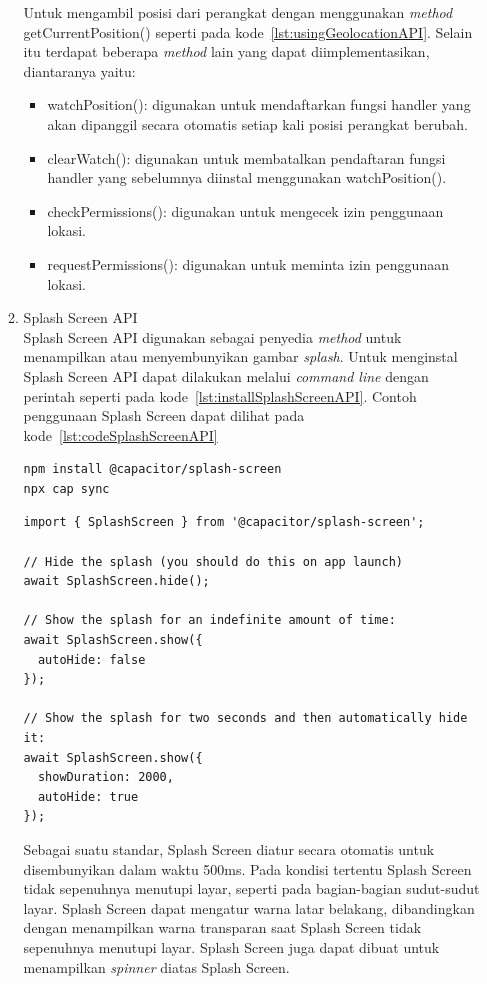 \begin{enumerate}
\begin{enumerate}
		Untuk mengambil posisi dari perangkat dengan menggunakan \textit{method} getCurrentPosition() seperti pada kode~\ref{lst:usingGeolocationAPI}. Selain itu terdapat beberapa \textit{method} lain yang dapat diimplementasikan, diantaranya yaitu:
		\newpage
			\begin{itemize}
				\item watchPosition(): digunakan untuk mendaftarkan fungsi handler yang akan dipanggil secara otomatis setiap kali posisi perangkat berubah.
				\item clearWatch(): digunakan untuk membatalkan pendaftaran fungsi handler yang sebelumnya diinstal menggunakan watchPosition().
				\item checkPermissions(): digunakan untuk mengecek izin penggunaan lokasi.
				\item requestPermissions(): digunakan untuk meminta izin penggunaan lokasi.
			\end{itemize}
			\item Splash Screen API	\\
			Splash Screen API digunakan sebagai penyedia \textit{method} untuk menampilkan atau menyembunyikan gambar \textit{splash}. Untuk menginstal Splash Screen API dapat dilakukan melalui \textit{command line} dengan perintah seperti pada kode~\ref{lst:installSplashScreenAPI}. Contoh penggunaan Splash Screen dapat dilihat pada kode~\ref{lst:codeSplashScreenAPI}
\begin{lstlisting}[label={lst:installSplashScreenAPI}, caption=Kode untuk Menginstal Splash Screen API]
npm install @capacitor/splash-screen
npx cap sync
\end{lstlisting}

\begin{lstlisting}[label={lst:codeSplashScreenAPI}, caption=Contoh Kode Penggunaan Splash Screen API]
import { SplashScreen } from '@capacitor/splash-screen';

// Hide the splash (you should do this on app launch)
await SplashScreen.hide();

// Show the splash for an indefinite amount of time:
await SplashScreen.show({
  autoHide: false
});

// Show the splash for two seconds and then automatically hide it:
await SplashScreen.show({
  showDuration: 2000,
  autoHide: true
});
\end{lstlisting}
			
			Sebagai suatu standar, Splash Screen diatur secara otomatis untuk disembunyikan dalam waktu 500ms. Pada kondisi tertentu Splash Screen tidak sepenuhnya menutupi layar, seperti pada bagian-bagian sudut-sudut layar. Splash Screen dapat mengatur warna latar belakang, dibandingkan dengan menampilkan warna transparan saat Splash Screen tidak sepenuhnya menutupi layar. Splash Screen juga dapat dibuat untuk menampilkan \textit{spinner} diatas Splash Screen. 
		

\end{enumerate}
\end{enumerate}
